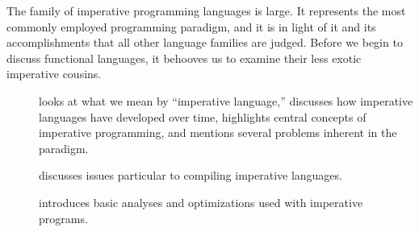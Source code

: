 \label{imperative:overview}
The family of imperative programming languages is large. It represents the most commonly employed programming paradigm, and it is in light of it and its accomplishments that all other language families are judged. Before we begin to discuss functional languages, it behooves us to examine their less exotic imperative cousins.
\begin{description}
\item[] looks at what we mean by ``imperative language,'' discusses how imperative languages have developed over time, highlights central concepts of imperative programming, and mentions several problems inherent in the paradigm.%
\item[] discusses issues particular to compiling imperative languages.
\item[] introduces basic analyses and optimizations used with imperative programs.%
\end{description}
